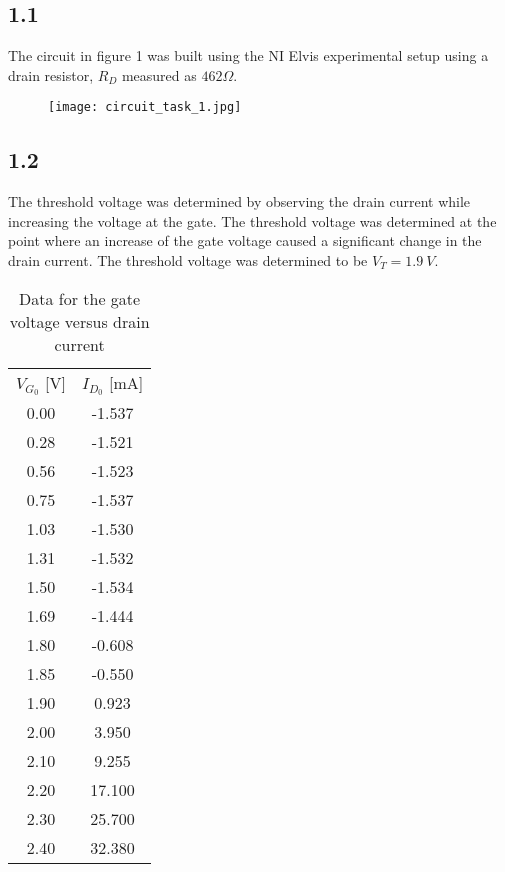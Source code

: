 \subsection*{1.1}
The circuit in figure 1 was built using the NI Elvis experimental setup using a drain resistor, $R_D$ measured as $462 \Omega$.

    \begin{figure}[h!]
        \centering
        \texttt{[image: circuit\_task\_1.jpg]}
    \end{figure}

\subsection*{1.2}
The threshold voltage was determined by observing the drain current while increasing the voltage at the gate. The threshold voltage was determined at the point where an increase of the gate voltage caused a significant change in the drain current. The threshold voltage was determined to be $V_T = 1.9 \ V$.

   \begin{table}[htbp]
     \centering
     \caption{Data for the gate voltage versus drain current}
       \begin{tabular}{cc}
       $V_{G_0}$ [V]       & $I_{D_0}$ [mA] \\
       0.00         & -1.537 \\
       0.28         & -1.521 \\
       0.56         & -1.523 \\
       0.75         & -1.537 \\
       1.03         & -1.530 \\
       1.31         & -1.532 \\
       1.50         & -1.534 \\
       1.69         & -1.444 \\
       1.80         & -0.608 \\
       1.85         & -0.550 \\
       1.90         & 0.923 \\
       2.00         & 3.950 \\
       2.10         & 9.255 \\
       2.20         & 17.100 \\
       2.30         & 25.700 \\
       2.40         & 32.380 \\
       \end{tabular}%
     \label{tab:addlabel}%
   \end{table}%


